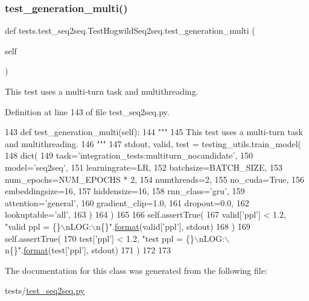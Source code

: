 \subsubsection{\texorpdfstring{test\+\_\+generation\+\_\+multi()}{test\_generation\_multi()}}
{\footnotesize\ttfamily def tests.\+test\+\_\+seq2seq.\+Test\+Hogwild\+Seq2seq.\+test\+\_\+generation\+\_\+multi (\begin{DoxyParamCaption}\item[{}]{self }\end{DoxyParamCaption})}

\begin{DoxyVerb}This test uses a multi-turn task and multithreading.
\end{DoxyVerb}
 

Definition at line 143 of file test\+\_\+seq2seq.\+py.


\begin{DoxyCode}
143     \textcolor{keyword}{def }test\_generation\_multi(self):
144         \textcolor{stringliteral}{"""}
145 \textcolor{stringliteral}{        This test uses a multi-turn task and multithreading.}
146 \textcolor{stringliteral}{        """}
147         stdout, valid, test = testing\_utils.train\_model(
148             dict(
149                 task=\textcolor{stringliteral}{'integration\_tests:multiturn\_nocandidate'},
150                 model=\textcolor{stringliteral}{'seq2seq'},
151                 learningrate=LR,
152                 batchsize=BATCH\_SIZE,
153                 num\_epochs=NUM\_EPOCHS * 2,
154                 numthreads=2,
155                 no\_cuda=\textcolor{keyword}{True},
156                 embeddingsize=16,
157                 hiddensize=16,
158                 rnn\_class=\textcolor{stringliteral}{'gru'},
159                 attention=\textcolor{stringliteral}{'general'},
160                 gradient\_clip=1.0,
161                 dropout=0.0,
162                 lookuptable=\textcolor{stringliteral}{'all'},
163             )
164         )
165 
166         self.assertTrue(
167             valid[\textcolor{stringliteral}{'ppl'}] < 1.2, \textcolor{stringliteral}{"valid ppl = \{\}\(\backslash\)nLOG:\(\backslash\)n\{\}"}.\hyperlink{namespaceparlai_1_1chat__service_1_1services_1_1messenger_1_1shared__utils_a32e2e2022b824fbaf80c747160b52a76}{format}(valid[\textcolor{stringliteral}{'ppl'}], stdout)
168         )
169         self.assertTrue(
170             test[\textcolor{stringliteral}{'ppl'}] < 1.2, \textcolor{stringliteral}{"test ppl = \{\}\(\backslash\)nLOG:\(\backslash\)n\{\}"}.\hyperlink{namespaceparlai_1_1chat__service_1_1services_1_1messenger_1_1shared__utils_a32e2e2022b824fbaf80c747160b52a76}{format}(test[\textcolor{stringliteral}{'ppl'}], stdout)
171         )
172 
173 
\end{DoxyCode}


The documentation for this class was generated from the following file\+:\begin{DoxyCompactItemize}
\item 
tests/\hyperlink{test__seq2seq_8py}{test\+\_\+seq2seq.\+py}\end{DoxyCompactItemize}
